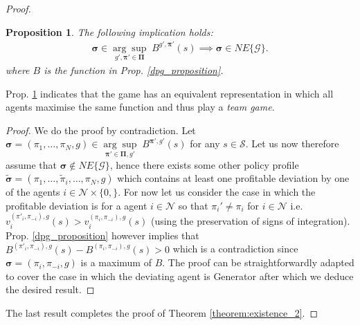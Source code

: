 \documentclass{article}
\newtheorem{proposition}{Proposition}
\begin{document}
\begin{proof}
\begin{proposition}\label{reduction_prop}
The following implication holds: 
\begin{align}
\boldsymbol{\sigma}\in \underset{{g',\boldsymbol{\pi'}}\in\boldsymbol{\Pi}}{\arg\sup}\; B^{g',{\boldsymbol{\pi'}}}(s)\implies \boldsymbol{\sigma}\in NE\{\mathcal{G}\}.
\end{align}
where $B$ is the function in Prop. \ref{dpg_proposition}.
\end{proposition}
Prop. \ref{reduction_prop} indicates that the game has an equivalent representation in which all agents maximise the same function and thus  play a \textit{team game}.
\begin{proof}
We do the proof by contradiction. Let $\boldsymbol{\sigma}=(\pi_1,\ldots,\pi_N,g)\in \underset{\boldsymbol{\pi'}\in\boldsymbol{\Pi},g'}{\arg\sup}\; B^{\boldsymbol{\pi'},g'}(s)$ for any $s\in\mathcal{S}$. Let us now therefore assume that $\boldsymbol{\sigma}\notin NE\{\mathcal{G}\}$, hence there exists some other policy profile $\boldsymbol{\tilde{\sigma}}=(\pi_1,\ldots,\tilde{\pi}_i,\ldots,\pi_N,g)$ which contains at least one profitable deviation by one of the agents $i\in\mathcal{N}\times\{0,\}$. For now let us consider the case in which the profitable deviation is for a agent $i\in\mathcal{N}$  so that $\pi_i'\neq \pi_i$ for $i\in\mathcal{N}$ i.e. $v^{(\pi'_i,\pi_{-i}),g}_i(s)> v^{(\pi_i,\pi_{-i}),g}_i(s)$ (using the preservation of signs of integration). Prop. \ref{dpg_proposition} however implies that $B^{(\pi'_i,\pi_{-i}),g}(s)-B^{(\pi_i,\pi_{-i}),g}(s)>0$ which is a contradiction since $\boldsymbol{\sigma}=(\pi_i,\pi_{-i},g)$ is a maximum of $B$.  The proof can be straightforwardly adapted to cover the case in which the deviating agent is {\selectfont Generator} after which we deduce the desired result.
\end{proof}
The last result completes the proof of Theorem \ref{theorem:existence_2}. 
\end{proof}
\end{document}
